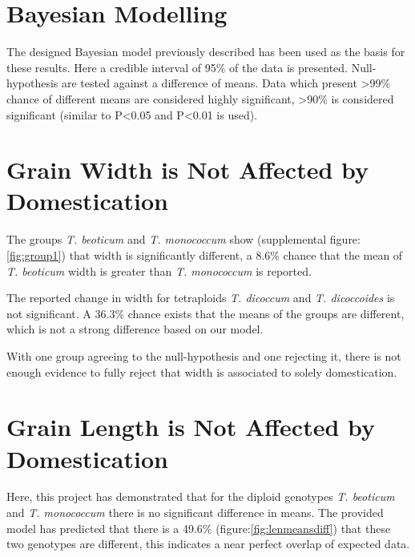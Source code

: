 \documentclass[11pt]{report}
\begin{document}
\section{Bayesian Modelling}
\label{sec:orgcc7ca8f}
The designed Bayesian model previously described has been used as the basis for these results. Here a credible interval of 95\% of the data is presented. Null-hypothesis are tested against a difference of means. Data which present >99\% chance of different means are considered highly significant, >90\% is considered significant (similar to P<0.05 and P<0.01 is used).


\section{Grain Width is Not Affected by Domestication}
\label{sec:org4b024b3}

The groups \emph{T. beoticum} and \emph{T. monococcum} show (supplemental figure:\ref{fig:group1}) that width is significantly different, a 8.6\% chance that the mean of \emph{T. beoticum} width is greater than \emph{T. monococcum} is reported.

The reported change in width for tetraploids \emph{T. dicoccum} and \emph{T. dicoccoides} is not significant. A 36.3\% chance exists that the means of the groups are different, which is not a strong difference based on our model.

With one group agreeing to the null-hypothesis and one rejecting it, there is not enough evidence to fully reject that width is associated to solely domestication.

\clearpage
\section{Grain Length is Not Affected by Domestication}
\label{sec:org40b3787}

Here, this project has demonstrated that for the diploid genotypes \emph{T. beoticum} and \emph{T. monococcum} there is no significant difference in means. The provided model has predicted that there is a 49.6\% (figure:\ref{fig:lenmeansdiff}) that these two genotypes are different, this indicates a near perfect overlap of expected data.
\end{document}
